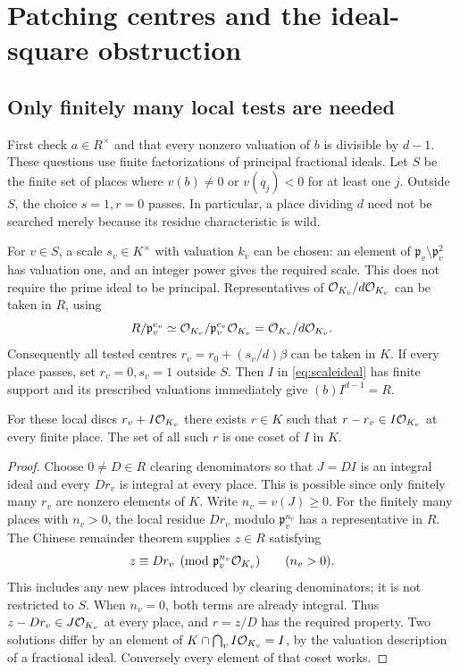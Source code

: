 \section{Patching centres and the ideal-square obstruction}\label{sec:global}

\subsection{Only finitely many local tests are needed}
First check $a\in R^\times$ and that every nonzero valuation of $b$
is divisible by $d-1$. These questions use finite factorizations of
principal fractional ideals. Let $S$ be the finite set of places
where $v(b)\ne0$ or $v(q_j)<0$ for at least one $j$. Outside $S$,
the choice $s=1,r=0$ passes. In particular, a place dividing $d$ need
not be searched merely because its residue characteristic is wild.

For $v\in S$, a scale $s_v\in K^\times$ with valuation $k_v$ can
be chosen: an element of $\mathfrak p_v\setminus\mathfrak p_v^2$
has valuation one, and an integer power gives the required scale.
This does not require the prime ideal to be principal. Representatives
of $\mathcal O_{K_v}/d\mathcal O_{K_v}$ can be taken in $R$, using
\[
 R/\mathfrak p_v^{e_v}\simeq
 \mathcal O_{K_v}/\mathfrak p_v^{e_v}\mathcal O_{K_v}
 =\mathcal O_{K_v}/d\mathcal O_{K_v}.
\]
Consequently all tested centres $r_v=r_0+(s_v/d)\beta$ can be taken
in $K$. If every place passes, set $r_v=0,s_v=1$ outside $S$.
Then $I$ in \eqref{eq:scaleideal} has finite support and its prescribed
valuations immediately give $(b)I^{d-1}=R$.

\begin{lemma}\label{lem:patch}
For these local discs $r_v+I\mathcal O_{K_v}$ there exists $r\in K$ such
that $r-r_v\in I\mathcal O_{K_v}$ at every finite place. The set of all
such $r$ is one coset of $I$ in $K$.
\end{lemma}
\begin{proof}
Choose $0\ne D\in R$ clearing denominators so that $J=DI$ is an
integral ideal and every $Dr_v$ is integral at every place. This is
possible since only finitely many $r_v$ are nonzero elements of $K$.
Write $n_v=v(J)\ge0$. For the finitely many places with $n_v>0$,
the local residue $Dr_v$ modulo $\mathfrak p_v^{n_v}$ has a
representative in $R$. The Chinese remainder theorem supplies
$z\in R$ satisfying
\[
 z\equiv Dr_v\pmod{\mathfrak p_v^{n_v}\mathcal O_{K_v}}
 \qquad(n_v>0).
\]
This includes any new places introduced by clearing denominators;
it is not restricted to $S$. When $n_v=0$, both terms are already
integral. Thus $z-Dr_v\in J\mathcal O_{K_v}$ at every place, and $r=z/D$
has the required property. Two solutions differ by an element of
$K\cap\bigcap_v I\mathcal O_{K_v}=I$, by the valuation description of
a fractional ideal. Conversely every element of that coset works.
\end{proof}

